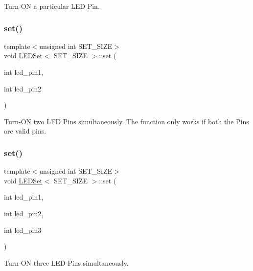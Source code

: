Turn-\/\+ON a particular L\+ED Pin. 

\mbox{\label{classLEDSet_a9912385e65dddd78cf0f41cce4fbcba2}} 
\subsubsection{\texorpdfstring{set()}{set()}\hspace{0.1cm}{\footnotesize\ttfamily [2/3]}}
{\footnotesize\ttfamily template$<$unsigned int S\+E\+T\+\_\+\+S\+I\+ZE$>$ \\
void \hyperlink{classLEDSet}{L\+E\+D\+Set}$<$ S\+E\+T\+\_\+\+S\+I\+ZE $>$\+::set (\begin{DoxyParamCaption}\item[{int}]{led\+\_\+pin1,  }\item[{int}]{led\+\_\+pin2 }\end{DoxyParamCaption})\hspace{0.3cm}{\ttfamily [inline]}}



Turn-\/\+ON two L\+ED Pins simultaneously. The function only works if both the Pins are valid pins. 

\mbox{\label{classLEDSet_a5dba15c24ec18e11f82368d203ceb9f1}} 
\subsubsection{\texorpdfstring{set()}{set()}\hspace{0.1cm}{\footnotesize\ttfamily [3/3]}}
{\footnotesize\ttfamily template$<$unsigned int S\+E\+T\+\_\+\+S\+I\+ZE$>$ \\
void \hyperlink{classLEDSet}{L\+E\+D\+Set}$<$ S\+E\+T\+\_\+\+S\+I\+ZE $>$\+::set (\begin{DoxyParamCaption}\item[{int}]{led\+\_\+pin1,  }\item[{int}]{led\+\_\+pin2,  }\item[{int}]{led\+\_\+pin3 }\end{DoxyParamCaption})\hspace{0.3cm}{\ttfamily [inline]}}



Turn-\/\+ON three L\+ED Pins simultaneously. 


